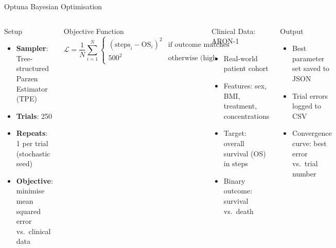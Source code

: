 \documentclass[aspectratio=169,10pt]{beamer}
\begin{document}
\begin{frame}{Optuna Bayesian Optimisation}
  \begin{columns}[T]
    \begin{block}{Setup}
      \begin{itemize}
        \item \textbf{Sampler}: Tree-structured Parzen Estimator (TPE)
        \item \textbf{Trials}: 250
        \item \textbf{Repeats}: 1 per trial (stochastic seed)
        \item \textbf{Objective}: minimise mean squared error vs.\ clinical data
      \end{itemize}
    \end{block}

    \begin{block}{Objective Function}
      \[
        \mathcal{L} = \frac{1}{N}\sum_{i=1}^{N}
        \begin{cases}
          (\text{steps}_i - \text{OS}_i)^2 & \text{if outcome matches} \\
          500^2 & \text{otherwise (high penalty)}
        \end{cases}
      \]
    \end{block}

    \begin{block}{Clinical Data: ARON-1}
      \begin{itemize}
        \item Real-world patient cohort
        \item Features: sex, BMI, treatment, concentrations
        \item Target: overall survival (OS) in steps
        \item Binary outcome: survival vs.\ death
      \end{itemize}
    \end{block}

    \begin{block}{Output}
      \begin{itemize}
        \item Best parameter set saved to JSON
        \item Trial errors logged to CSV
        \item Convergence curve: best error vs.\ trial number
      \end{itemize}
    \end{block}
  \end{columns}
\end{frame}
\end{document}
